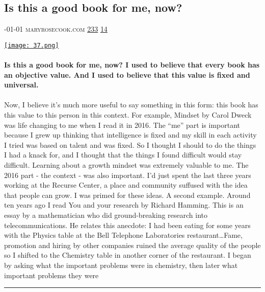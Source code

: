 \documentclass[10pt,a4paper]{article}
\begin{document}
\begin{multicols*}{2}
\begin{minipage}{\linewidth}
\subsection{Is this a good book for me, now?}
\textsc{\footnotesize
{\scriptsize\faCalendar}-01-01 
{\scriptsize\faGlobe}\space 
maryrosecook.com 
{\scriptsize\faThumbsOUp}\space 
\href{http://news.ycombinator.com/item?id=37144601\&utm\_term=comment}{233} 
{\scriptsize\faComments}\space 
\href{http://news.ycombinator.com/item?id=37144601\&utm\_term=comment}{14} 
}
\par\medskip\noindent
\href{https://maryrosecook.com/blog/post/is-this-a-good-book-for-me-now?utm\_source=hackernewsletter\&utm\_medium=email\&utm\_term=books}{
    \texttt{[image: 37.png]}
}
\end{minipage}
\paragraph{}
\textbf{Is this a good book for me, now?
I used to believe that every book has an objective value. And I used to believe that this value is fixed and universal.}
\paragraph{}

Now, I believe it’s much more useful to say something in this form: this book has this value to this person in this context.
For example, Mindset by Carol Dweck was life changing to me when I read it in 2016.
The “me” part is important because I grew up thinking that intelligence is fixed and my skill in each activity I tried was based on talent and was fixed. So I thought I should to do the things I had a knack for, and I thought that the things I found difficult would stay difficult. Learning about a growth mindset was extremely valuable to me.
The 2016 part - the context - was also important. I’d just spent the last three years working at the Recurse Center, a place and community suffused with the idea that people can grow. I was primed for these ideas.
A second example. Around ten years ago I read You and your research by Richard Hamming. This is an essay by a mathematician who did ground-breaking research into telecommunications. He relates this anecdote:
I had been eating for some years with the Physics table at the Bell Telephone Laboratories restaurant…Fame, promotion and hiring by other companies ruined the average quality of the people so I shifted to the Chemistry table in another corner of the restaurant. I began by asking what the important problems were in chemistry, then later what important problems they were 
\par\noindent\textcolor{red}{\rule{\linewidth}{0.2mm}}
\vfill
\null
\noindent\begin{minipage}{\linewidth}

\end{minipage}
\end{multicols*}
\end{document}

